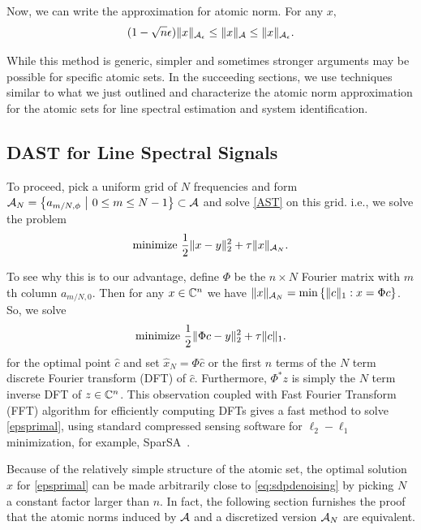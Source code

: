 Now, we can write the approximation for atomic norm. For any $x,$
\begin{equation}
\label{eq:enet-approx}	
(1-\sqrt{n}\epsilon)\lVert x\rVert_{\mathcal{A}_\epsilon} \leq \lVert x\rVert_{\mathcal{A}} \leq \lVert x\rVert_{\mathcal{A}_\epsilon}.
\end{equation}

While this method is generic, simpler and sometimes stronger arguments may be
possible for specific atomic sets. In the succeeding sections, we use techniques
similar to what we just outlined and characterize the atomic norm approximation
for the atomic sets for line spectral estimation and system identification.


\subsection{DAST for Line Spectral Signals}\label{sec:comp-method}

To proceed, pick a uniform grid of $N$ frequencies and form $\mathcal{A}_N = \left\{
a_{m/N,\phi} ~\middle|~ 0 \leq m \leq N-1 \right\} \subset \mathcal{A} $ and solve
\eqref{AST} on this grid. i.e., we solve the problem
\begin{equation}
	\label{epsprimal} \text{minimize }\frac{1}{2} \lVert x - y\rVert_2^2 + \tau \lVert x\rVert_{\mathcal{A}_N}. 
\end{equation}

To see why this is to our advantage, define $\Phi$ be the $n \times N$ Fourier
matrix with $m$th column $a_{m/N,0}$. Then for any $x \in \mathbb{C}^n$ we have $\lVert x\rVert_{\mathcal{A}_N} = \min\left\{ \lVert c\rVert_1: x = \Phi c \right\}$.
So, we solve
\begin{equation}
	\label{sparsa} \text{minimize }\frac{1}{2} \lVert\Phi c- y\rVert_2^2 + \tau \lVert c\rVert_1. 
\end{equation}
for the optimal point $\hat{c}$ and set $\hat{x}_N = \Phi \hat{c}$ or the first
$n$ terms of the $N$ term discrete Fourier transform (DFT) of $\hat{c}$.
Furthermore, $\Phi^* z$ is simply the $N$ term inverse DFT of $z \in \mathbb{C}^n$.
This observation coupled with Fast Fourier Transform (FFT) algorithm for
efficiently computing DFTs gives a fast method to solve \eqref{epsprimal},
using standard compressed sensing software for $\ell_2-\ell_1$ minimization,
for example, SparSA~\cite{wright09}.

Because of the relatively simple structure of the atomic set, the optimal
solution $\hat{x}$ for \eqref{epsprimal} can be made arbitrarily close to
\eqref{eq:sdpdenoising} by picking $N$ a constant factor larger than $n$. In
fact, the following section furnishes the proof that the atomic norms induced by $\mathcal{A}$ and a discretized version $\mathcal{A}_N$ are equivalent.

